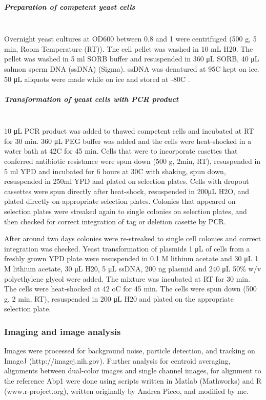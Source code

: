 \subparagraph{Preparation of competent yeast cells} 
\mbox{}\\
Overnight yeast cultures at OD600 between 0.8 and 1 were centrifuged (500 g, 5 min, Room Temperature (RT)). The cell
pellet was washed in 10 mL H20. The pellet was washed in 5 ml SORB buffer and resuspended in 360 μL SORB, 40 μL salmon sperm DNA (ssDNA) (Sigma). ssDNA was denatured at 95C kept on ice. 50 μL aliquots were made while on ice and stored at -80C .

\subparagraph{Transformation of yeast cells with PCR product} 
\mbox{}\\
10 μL PCR product was added to thawed competent cells and incubated at RT for 30 min. 360 μL PEG buffer was added and the cells were heat-shocked in a water bath at 42C for 45 min. Cells that were to incorporate casettes that conferred antibiotic resistance were spun down (500 g, 2min, RT), resuspended in 5 ml YPD and incubated for 6 hours at 30C with shaking, spun down, resuspended in 250ml YPD and plated on selection plates. Cells with dropout cassettes were spun directly after heat-shock, resuspended in 200μL H2O, and plated directly on appropriate selection plates. Colonies that appeared on selection plates were streaked again to single colonies on selection plates, and then checked for correct integration of tag or deletion casette by PCR.

After around two days colonies were re-streaked to single cell colonies and correct integration was checked.
Yeast transformation of plasmids
1 μL of cells from a freshly grown YPD plate were resuspended in 0.1 M lithium acetate and 30 μL 1 M lithium acetate, 30 μL H20, 5 μL ssDNA, 200 ng plasmid and 240 μL 50\% w/v polyethylene glycol were added. The mixture was incubated at RT for 30 min. The cells were heat-shocked at 42 oC for 45 min. The cells were spun down (500 g, 2 min, RT), resuspended in 200 μL H20 and plated on the appropriate selection plate.

\subsubsection{Imaging and image analysis }
Images were processed for background noise, particle detection, and tracking on ImageJ (http://imagej.nih.gov). Further analysis for centroid averaging, alignments between dual-color images and single channel images, for alignment to the reference Abp1 were done using scripts written in Matlab (Mathworks) and R (www.r-project.org), written originally by Andrea Picco, and modified by me. 

